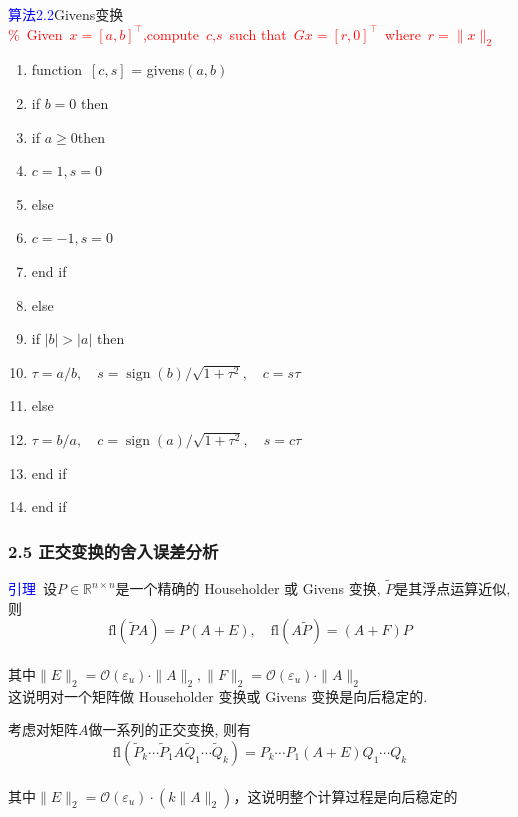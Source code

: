 \documentclass[notheorems,serif]{beamer}
\begin{document}
\begin{frame}
\noindent \textcolor{blue}{算法2.2}Givens变换\\
\textcolor{red}{\%~Given~$x=[a,b]^{\top}$,compute~$c$,$s$~such that~$Gx=[r,0]^{\top}$~where~$r=\|x\|_2$}
\begin{enumerate}[1:]
	\item function~$[c,s]$ = givens$(a,b)$
	\item if $b=0$ then
	\item \qquad if $a \ge 0$then
	\item \qquad \qquad $c=1,s=0$
	\item \qquad else
	\item \qquad \qquad $c=-1,s=0$
	\item \qquad end if
	\item else
	\item \qquad if $|b|>|a|$ then
	\item \qquad \qquad $\tau=a / b, \quad s=\operatorname{sign}(b) / \sqrt{1+\tau^{2}}, \quad c=s \tau$
	\item \qquad else
	\item \qquad \qquad $\tau=b / a, \quad c=\operatorname{sign}(a) / \sqrt{1+\tau^{2}}, \quad s=c \tau$
	\item \qquad end if
	\item end if  
\end{enumerate}
\end{frame}

\begin{frame}
\frametitle{2.5 正交变换的舍入误差分析}
\noindent \textcolor{blue}{引理}~设$P \in \mathbb{R}^{n \times n}$是一个精确的 Householder 或 Givens 变换, $\tilde P$是其浮点运算近似, 则$$
\mathrm{fl}(\tilde{P} A)=P(A+E), \quad \mathrm{fl}(A \tilde{P})=(A+F) P
$$\\
其中$\|E\|_{2}=\mathcal{O}\left(\varepsilon_{u}\right) \cdot\|A\|_{2},\|F\|_{2}=\mathcal{O}\left(\varepsilon_{u}\right) \cdot\|A\|_{2}$\\

\noindent 这说明对一个矩阵做 Householder 变换或 Givens 变换是向后稳定的.

考虑对矩阵$A$做一系列的正交变换, 则有$$
\mathrm{fl}\left(\tilde{P}_{k} \cdots \tilde{P}_{1} A \tilde{Q}_{1} \cdots \tilde{Q}_{k}\right)=P_{k} \cdots P_{1}(A+E) Q_{1} \cdots Q_{k}
$$\\其中$\|E\|_{2}=\mathcal{O}\left(\varepsilon_{u}\right) \cdot\left(k\|A\|_{2}\right)$，这说明整个计算过程是向后稳定的
\end{frame}
\end{document}

